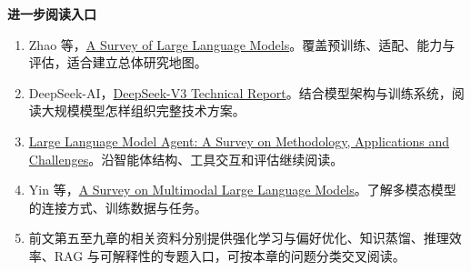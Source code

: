 \textbf{进一步阅读入口}
\begin{enumerate}
    \item Zhao 等，\href{https://arxiv.org/abs/2303.18223}{A Survey of Large Language Models}。覆盖预训练、适配、能力与评估，适合建立总体研究地图。
    \item DeepSeek-AI，\href{https://arxiv.org/abs/2412.19437}{DeepSeek-V3 Technical Report}。结合模型架构与训练系统，阅读大规模模型怎样组织完整技术方案。
    \item \href{https://arxiv.org/abs/2503.21460}{Large Language Model Agent: A Survey on Methodology, Applications and Challenges}。沿智能体结构、工具交互和评估继续阅读。
    \item Yin 等，\href{https://arxiv.org/abs/2306.13549}{A Survey on Multimodal Large Language Models}。了解多模态模型的连接方式、训练数据与任务。
    \item 前文第五至九章的相关资料分别提供强化学习与偏好优化、知识蒸馏、推理效率、RAG 与可解释性的专题入口，可按本章的问题分类交叉阅读。
\end{enumerate}
